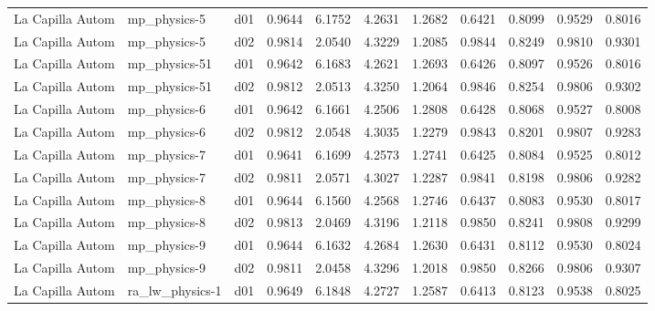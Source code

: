 \begin{longtable}{lllrrrrrrrr}
     La Capilla Autom  &          mp\_physics-5 &     d01 &   0.9644 &   6.1752 &   4.2631 &       1.2682 &        0.6421 &       0.8099 &           0.9529 &  0.8016 \\
     La Capilla Autom  &          mp\_physics-5 &     d02 &   0.9814 &   2.0540 &   4.3229 &       1.2085 &        0.9844 &       0.8249 &           0.9810 &  0.9301 \\
     La Capilla Autom  &         mp\_physics-51 &     d01 &   0.9642 &   6.1683 &   4.2621 &       1.2693 &        0.6426 &       0.8097 &           0.9526 &  0.8016 \\
     La Capilla Autom  &         mp\_physics-51 &     d02 &   0.9812 &   2.0513 &   4.3250 &       1.2064 &        0.9846 &       0.8254 &           0.9806 &  0.9302 \\
     La Capilla Autom  &          mp\_physics-6 &     d01 &   0.9642 &   6.1661 &   4.2506 &       1.2808 &        0.6428 &       0.8068 &           0.9527 &  0.8008 \\
     La Capilla Autom  &          mp\_physics-6 &     d02 &   0.9812 &   2.0548 &   4.3035 &       1.2279 &        0.9843 &       0.8201 &           0.9807 &  0.9283 \\
     La Capilla Autom  &          mp\_physics-7 &     d01 &   0.9641 &   6.1699 &   4.2573 &       1.2741 &        0.6425 &       0.8084 &           0.9525 &  0.8012 \\
     La Capilla Autom  &          mp\_physics-7 &     d02 &   0.9811 &   2.0571 &   4.3027 &       1.2287 &        0.9841 &       0.8198 &           0.9806 &  0.9282 \\
     La Capilla Autom  &          mp\_physics-8 &     d01 &   0.9644 &   6.1560 &   4.2568 &       1.2746 &        0.6437 &       0.8083 &           0.9530 &  0.8017 \\
     La Capilla Autom  &          mp\_physics-8 &     d02 &   0.9813 &   2.0469 &   4.3196 &       1.2118 &        0.9850 &       0.8241 &           0.9808 &  0.9299 \\
     La Capilla Autom  &          mp\_physics-9 &     d01 &   0.9644 &   6.1632 &   4.2684 &       1.2630 &        0.6431 &       0.8112 &           0.9530 &  0.8024 \\
     La Capilla Autom  &          mp\_physics-9 &     d02 &   0.9811 &   2.0458 &   4.3296 &       1.2018 &        0.9850 &       0.8266 &           0.9806 &  0.9307 \\
     La Capilla Autom  &       ra\_lw\_physics-1 &     d01 &   0.9649 &   6.1848 &   4.2727 &       1.2587 &        0.6413 &       0.8123 &           0.9538 &  0.8025 \\

\end{longtable}
